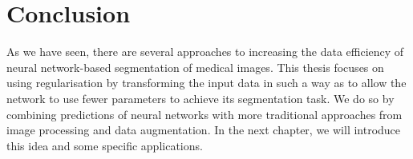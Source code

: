 \section{Conclusion}

As we have seen, there are several approaches to increasing the data efficiency of neural network-based segmentation of medical images. This thesis focuses on using regularisation by transforming the input data in such a way as to allow the network to use fewer parameters to achieve its segmentation task. We do so by combining predictions of neural networks with more traditional approaches from image processing and data augmentation. In the next chapter, we will introduce this idea and some specific applications.


